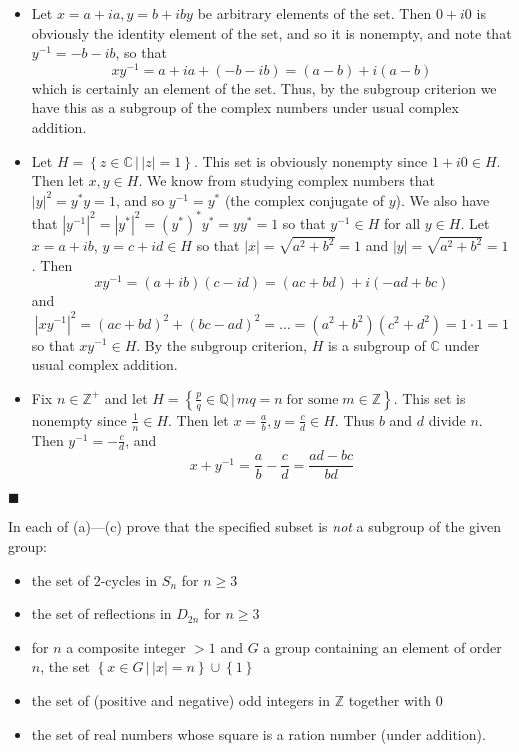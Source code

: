 \documentclass[12pt]{article}
\renewcommand{\qed}{\hfill$\blacksquare$}
\renewenvironment{proof}{\begin{addmargin}[1em]{0em}\begin{newproof}}{\end{newproof}\end{addmargin}\qed}
\newenvironment{problem}[2][Exercise]{\begin{trivlist}
\item[\hskip \labelsep {\bfseries #1}\hskip \labelsep {\bfseries #2.}]}{\end{trivlist}}
\begin{document}
\begin{proof}
\begin{itemize}
	\item Let $x=a+ia, y=b+iby $ be arbitrary elements of the set. Then $0+i0$ is obviously the identity element of the set, and so it is nonempty, and note that $y^{-1}=-b-ib$, so that $$xy^{-1}=a+ia + \left(-b-ib\right) = \left(a-b\right)+i\left(a-b\right) $$ which is certainly an element of the set. Thus, by the subgroup criterion we have this as a subgroup of the complex numbers under usual complex addition.\\
	\item Let $H=\left\{z \in \mathbb{C} \, | \, \left|z\right|=1\right\}$. This set is obviously nonempty since $1+i0\in H$. Then let $x,y\in H$. We know from studying complex numbers that $\left|y\right|^2 = y^*y = 1$, and so $y^{-1}=y^*$ (the complex conjugate of $y$). We also have that $\left|y^{-1}\right|^2=\left|y^*\right|^2 = \left(y^*\right)^* y^* = yy^* = 1$ so that $y^{-1} \in H$ for all $y\in H$. Let $x=a+ib$, $y=c+id \in H$ so that $\left|x\right|=\sqrt{a^2+b^2} = 1$ and $\left|y\right|=\sqrt{a^2+b^2}=1$. Then $$ xy^{-1}= \left(a+ib\right)\left(c-id\right) = \left(ac+bd\right)+i\left(-ad+bc\right)$$ and $$\left|xy^{-1}\right|^2 = \left(ac+bd\right)^2+\left(bc-ad\right)^2= \ldots = \left(a^2+b^2\right)\left(c^2+d^2\right) = 1\cdot 1 = 1 $$ so that $xy^{-1} \in H$. By the subgroup criterion, $H$ is a subgroup of $\mathbb{C}$ under usual complex addition.\\
	\item Fix $n\in \mathbb{Z}^+$ and let $H = \left\{ \frac{p}{q}\in \mathbb{Q} \, | \,  mq = n\; \text{for some} \; m\in \mathbb{Z} \right\} $. This set is nonempty since $\frac{1}{n} \in H$. Then let $x=\frac{a}{b}, y=\frac{c}{d} \in H$. Thus $b$ and $d$ divide $n$. Then $y^{-1}=-\frac{c}{d}$, and $$ x+y^{-1} = \frac{a}{b} -\frac{c}{d} = \frac{ad-bc}{bd} $$
\end{itemize}
\end{proof}


\begin{problem}{2.1.2}
In each of (a)---(c) prove that the specified subset is \textit{not} a subgroup of the given group:
\begin{itemize}
	\item the set of $2$-cycles in $S_n$ for $n\geq 3$
	\item the set of reflections in $D_{2n}$ for $n\geq 3$
	\item for $n$ a composite integer $>1$ and $G$ a group containing an element of order $n$, the set $\left\{x\in G \, | \, \left|x\right|=n\right\}\cup \left\{1\right\}$
	\item the set of (positive and negative) odd integers in $\mathbb{Z}$ together with $0$
	\item the set of real numbers whose square is a ration number (under addition).
\end{itemize}
\end{problem} 
\end{document}
